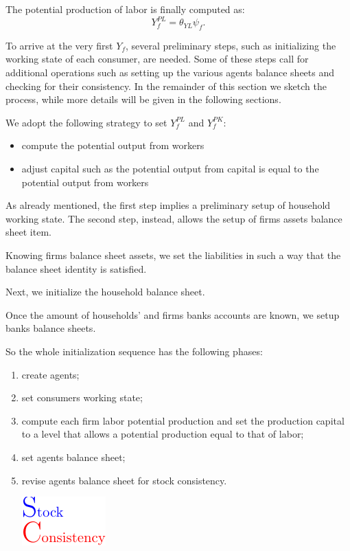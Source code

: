 \documentclass{book}
\begin{document}
\vskip5mm

The potential production of labor is finally computed as:
\[
	Y^{PL}_f=\theta_{YL}\psi_f.
\]




To arrive at the very first $Y_f$,  several preliminary steps, such as initializing the working state of each consumer, are needed. Some of these steps call for additional operations such as setting up the various agents balance sheets and checking for their consistency.
In the remainder of this section we sketch the process, while more details will be given in the following sections.

We adopt the following strategy to set $Y^{PL}_f$ and $Y^{PK}_f$: 
\begin{itemize}
	\item compute the potential output from workers
	\item adjust capital such as the potential output from capital is equal to the potential output from workers 
\end{itemize}

As already mentioned, the first step implies a preliminary setup of household working state. The second step, instead, allows the setup of firms assets balance sheet item. 

Knowing firms balance sheet assets, we set the liabilities in such a way that the balance sheet identity is satisfied.

Next, we initialize the household balance sheet.

Once the amount of households' and firms banks accounts are known, we setup banks balance sheets.

So the whole initialization sequence has the following phases:
\begin{enumerate}
	\item create agents;
	\item set consumers working state;
	\item compute each firm labor potential production and set the production capital to a level that allows a potential production equal to that of labor;
	\item set agents balance sheet;
	\item revise agents balance sheet for stock consistency.\begin{marginfigure}
	\hskip1cm\includegraphics[scale=1.0]{sc_logo-0.pdf}
\end{marginfigure}

\end{enumerate}
\end{document}
